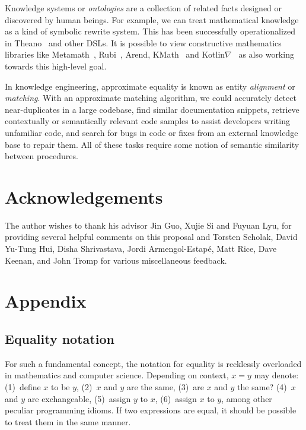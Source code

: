 \documentclass[11pt]{article}
\begin{document}
    Knowledge systems or \textit{ontologies} are a collection of related facts designed or discovered by human beings. For example, we can treat mathematical knowledge as a kind of symbolic rewrite system. This has been successfully operationalized in Theano~\citep{bergstra2010theano} and other DSLs. It is possible to view constructive mathematics libraries like Metamath~\citep{megill2006metamath}, Rubi~\citep{rich2009knowledge}, Arend, KMath~\citep{nozik2019kotlin} and Kotlin$\nabla$~\citep{considine2019kotlingrad} as also working towards this high-level goal.

    In knowledge engineering, approximate equality is known as entity \textit{alignment} or \textit{matching}. With an approximate matching algorithm, we could accurately detect near-duplicates in a large codebase, find similar documentation snippets, retrieve contextually or semantically relevant code samples to assist developers writing unfamiliar code, and search for bugs in code or fixes from an external knowledge base to repair them. All of these tasks require some notion of semantic similarity between procedures.

    \pagebreak \section{Acknowledgements}

    The author wishes to thank his advisor Jin Guo, Xujie Si and Fuyuan Lyu, for providing several helpful comments on this proposal and Torsten Scholak, David Yu-Tung Hui, Disha Shrivastava, Jordi Armengol-Estap\'e, Matt Rice, Dave Keenan, and John Tromp for various miscellaneous feedback.

    
    

  \appendix
  \section{Appendix}
    \subsection{Equality notation}
    For such a fundamental concept, the notation for equality is recklessly overloaded in mathematics and computer science. Depending on context, $x = y$ may denote: (1)~define $x$ to be $y$, (2)~$x$ and $y$ are the same, (3)~are $x$ and $y$ the same? (4)~$x$ and $y$ are exchangeable, (5)~assign $y$ to $x$, (6)~assign $x$ to $y$, among other peculiar programming idioms. If two expressions are equal, it should be possible to treat them in the same manner.
\end{document}
